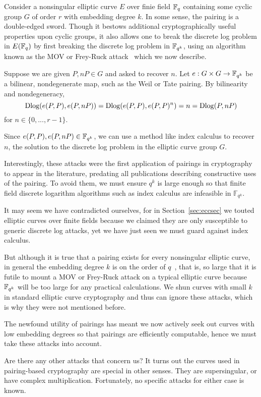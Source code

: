 Consider a nonsingular elliptic curve $E$ over finie field $\mathbb{F}_q$ containing
some cyclic group $G$ of order $r$ with embedding degree $k$.
In some sense, the pairing is a double-edged sword. Though it
bestows additional cryptographically useful properties upon cyclic groups,
it also allows one to break the discrete log problem in $E(\mathbb{F}_q)$
by first breaking the discrete log problem in $\mathbb{F}_{q^k}$,
using an algorithm known as the MOV or Frey-Ruck attack~\cite{mov,fr}
which we now describe.

Suppose we are given $P, nP \in G$ and asked to recover $n$.
Let $e : G \times G \rightarrow \mathbb{F}_{q^k}$ be a bilinear, nondegenerate map,
such as the Weil or Tate pairing.
By bilinearity and nondegeneracy,
\[ \mathop{\rm Dlog} ( e(P,P), e(P, nP) )
= \mathop{\rm Dlog} (e(P,P),e(P,P)^n) = n = \mathop{\rm Dlog}(P,nP) \]
for $n \in \{0,...,r-1\}$.

Since $e(P,P), e(P, nP) \in \mathbb{F}_{q^k}$,
we can use a method like index calculus
to recover $n$, the solution
to the discrete log problem in the elliptic curve group $G$.

Interestingly, these attacks were the first application of pairings
in cryptography to appear in the literature,
predating all publications describing constructive uses of the pairing.
To avoid them, we must ensure $q^k$ is large enough so that
finite field discrete logarithm algorithms such as index calculus are
infeasible in $\mathbb{F}_{q^k}$.

It may seem we have contradicted ourselves, for in Section~\ref{sec:eccsec}
we touted elliptic curves over finite fields because we claimed they
are only susceptible to generic discrete log attacks, yet we have just seen
we must guard against index calculus.

But although it is true that a pairing exists
for every nonsingular elliptic curve, in general
the embedding degree $k$ is on the order of $q$~\cite{bk},
that is, so large that it is futile to mount a MOV or
Frey-Ruck attack on a typical elliptic curve
because $\mathbb{F}_{q^k}$ will be too large for any practical calculations.
We shun curves with small $k$ in standard elliptic curve cryptography
and thus can ignore these attacks, which is why they were not mentioned before.

The newfound utility of pairings has meant 
we now actively seek out curves with low embedding degrees so that pairings
are efficiently computable,
hence we must take these attacks into account.

Are there any other attacks that concern us? It turns out
the curves used in pairing-based cryptography are special in other senses.
They are supersingular, or have complex multiplication.
Fortunately, no specific attacks for either case is known.

